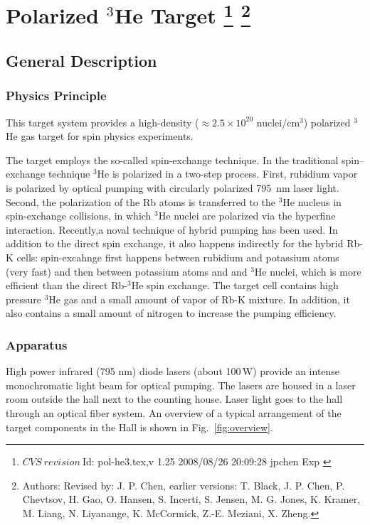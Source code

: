 \chapter[Polarized $^3$He Target]{Polarized $^3$He Target
\footnote{
  $CVS~revision~ $Id: pol-he3.tex,v 1.25 2008/08/26 20:09:28 jpchen Exp $ $
}
\footnote{Authors: Revised by: J. P. Chen, earlier versions: 
T. Black, J. P. Chen, P. Chevtsov, H. Gao, 
O. Hansen, S. Incerti, S. Jensen, M. G. Jones, K. Kramer, M. Liang, 
N. Liyanange, K. McCormick, Z.-E. Meziani, X. Zheng.
}
}

\section{General Description}
\label{sec:target-he3-general}
\subsection{Physics Principle}

This target system provides a high-density 
($\approx 2.5\times 10^{20}$ nuclei/cm$^3$)
polarized $^3$He gas target for spin physics experiments. 

The target employs the so-called spin-exchange technique.
In the traditional spin--exchange technique $^3$He is polarized in 
a two-step process.
First, rubidium vapor is polarized by optical pumping with
circularly polarized 795~nm laser light. Second, the polarization
of the Rb atoms is transferred to the $^3$He nucleus in spin-exchange
collisions, in which $^3$He nuclei are polarized via the hyperfine interaction.
Recently,a noval technique of hybrid pumping has been used.  
In addition to the direct spin exchange, it also happens indirectly for the 
hybrid Rb-K cells: spin-excahnge first happens between rubidium and potassium atoms 
(very fast) and 
then between potassium atoms and and $^3$He nuclei, which is more efficient 
than the direct Rb-$^3$He spin exchange.
The target cell contains high pressure $^3$He gas and a small amount of
vapor of Rb-K mixture. 
In addition, it
also contains a small amount of nitrogen to increase the
pumping efficiency.

\subsection{Apparatus}

High power infrared (795 nm) diode lasers (about 100\,W) provide an intense 
monochromatic
light beam for optical pumping. 
The lasers are housed in a laser room
outside the hall next to the counting house. Laser light goes to the hall 
through an optical fiber system.  An overview of a
typical arrangement of the target components in the Hall is shown in
Fig.~\ref{fig:overview}.

